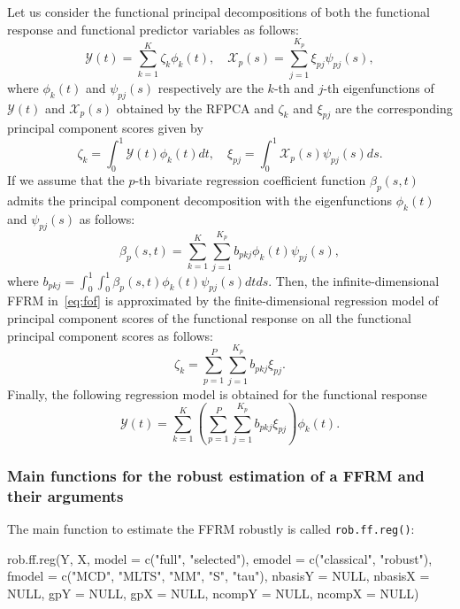 Let us consider the functional principal decompositions of both the functional response and functional predictor variables as follows:
\begin{equation*}
\mathcal{Y}(t) = \sum_{k=1}^K \zeta_k \phi_k(t), \quad \mathcal{X}_p(s) = \sum_{j=1}^{K_p} \xi_{pj} \psi_{pj}(s),
\end{equation*}
where $\phi_k(t)$ and $\psi_{pj}(s)$ respectively are the $k$-th and $j$-th eigenfunctions of $\mathcal{Y}(t)$ and $\mathcal{X}_p(s)$ obtained by the RFPCA and $\zeta_k$ and $\xi_{pj}$ are the corresponding principal component scores given by
\begin{equation*}
\zeta_k = \int_0^1 \mathcal{Y}(t) \phi_k(t) dt, \quad \xi_{pj} = \int_0^1 \mathcal{X}_p(s) \psi_{pj}(s) ds.
\end{equation*}
If we assume that the $p$-th bivariate regression coefficient function $\beta_p(s,t)$ admits the principal component decomposition with the eigenfunctions $\phi_k(t)$ and $\psi_{pj}(s)$ as follows:
\begin{equation*}
\beta_p(s,t) = \sum_{k=1}^K \sum_{j=1}^{K_p} b_{pkj} \phi_k(t) \psi_{pj}(s),
\end{equation*}
where $b_{pkj} = \int_0^1 \int_0^1 \beta_p(s,t) \phi_k(t) \psi_{pj}(s) dt ds$. Then, the infinite-dimensional FFRM in~\eqref{eq:fof} is approximated by the finite-dimensional regression model of principal component scores of the functional response on all the functional principal component scores as follows:
\begin{equation*}
\zeta_k = \sum_{p=1}^P \sum_{j=1}^{K_p} b_{pkj} \xi_{pj}.
\end{equation*}
Finally, the following regression model is obtained for the functional response
\begin{equation*}
\mathcal{Y}(t) = \sum_{k=1}^K \left(\sum_{p=1}^P \sum_{j=1}^{K_p} b_{pkj} \xi_{pj} \right) \phi_k(t).
\end{equation*}

\subsubsection*{Main functions for the robust estimation of a FFRM and their arguments}

The main function to estimate the FFRM robustly is called \texttt{rob.ff.reg()}:
\begin{smallexample}
\begin{smallverbatim}
rob.ff.reg(Y, X, model = c("full", "selected"), emodel = c("classical", "robust"),
fmodel = c("MCD", "MLTS", "MM", "S", "tau"), nbasisY = NULL, nbasisX = NULL,
gpY = NULL, gpX = NULL, ncompY = NULL, ncompX = NULL)
\end{smallverbatim}
\end{smallexample}

